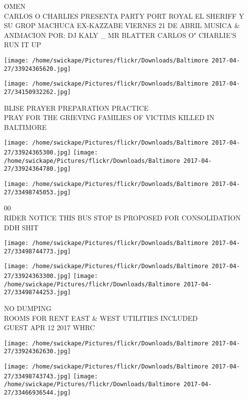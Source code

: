 \documentclass[10pt,letterpaper]{article}
\begin{document}
OMEN\\
CARLOS O CHARLIES PRESENTA PARTY PORT ROYAL EL SHERIFF Y SU GROP MACHUCA EX{-}KAZZABE VIERNES 21 DE ABRIL MUSICA \& ANIMACION POR: DJ KALY \_ MR BLATTER CARLOS O" CHARLIE'S\\
RUN IT UP
\pagebreak

\texttt{[image: /home/swickape/Pictures/flickr/Downloads/Baltimore 2017-04-27/33924365620.jpg]}

\vspace{0.25in}
\texttt{[image: /home/swickape/Pictures/flickr/Downloads/Baltimore 2017-04-27/34150932262.jpg]}

BLISE PRAYER PREPARATION PRACTICE\\
PRAY FOR THE GRIEVING FAMILIES OF VICTIMS KILLED IN BALTIMORE
\pagebreak

\texttt{[image: /home/swickape/Pictures/flickr/Downloads/Baltimore 2017-04-27/33924365300.jpg]}
\texttt{[image: /home/swickape/Pictures/flickr/Downloads/Baltimore 2017-04-27/33924364780.jpg]}

\texttt{[image: /home/swickape/Pictures/flickr/Downloads/Baltimore 2017-04-27/33498745053.jpg]}

00\\
RIDER NOTICE THIS BUS STOP IS PROPOSED FOR CONSOLIDATION\\
DDH SHIT
\pagebreak

\texttt{[image: /home/swickape/Pictures/flickr/Downloads/Baltimore 2017-04-27/33498744773.jpg]}

\vspace{0.25in}
\texttt{[image: /home/swickape/Pictures/flickr/Downloads/Baltimore 2017-04-27/33924363300.jpg]}
\texttt{[image: /home/swickape/Pictures/flickr/Downloads/Baltimore 2017-04-27/33498744253.jpg]}

NO DUMPING\\
ROOMS FOR RENT EAST \& WEST UTILITIES INCLUDED\\
GUEST APR 12 2017 WHRC
\pagebreak

\texttt{[image: /home/swickape/Pictures/flickr/Downloads/Baltimore 2017-04-27/33924362630.jpg]}

\vspace{0.25in}
\texttt{[image: /home/swickape/Pictures/flickr/Downloads/Baltimore 2017-04-27/33498743743.jpg]}
\texttt{[image: /home/swickape/Pictures/flickr/Downloads/Baltimore 2017-04-27/33466936544.jpg]}
\end{document}
